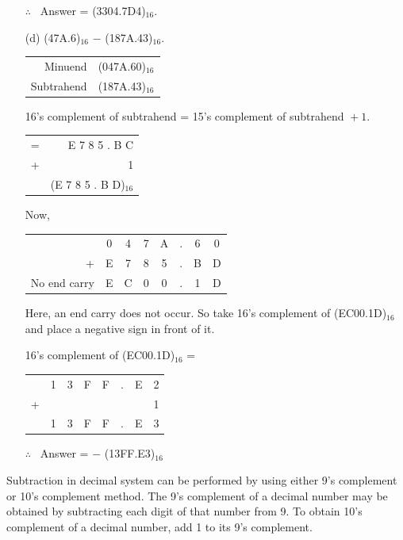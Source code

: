 \begin{solution}
\begin{itemize}
$\therefore$~ Answer = (3304.7D4)$_{16}$.

\item[(d)] (47A.6)$_{16}$ $-$ (187A.43)$_{16}$.
\begin{center}
\begin{tabular}{r@{\;=\;}l}
Minuend & (047A.60)$_{16}$\\
Subtrahend & (187A.43)$_{16}$
\end{tabular}
\end{center}
16's complement of subtrahend = 15's complement of subtrahend ${}+1$.

\smallskip
\begin{tabular}{@{\hspace{2cm}}rr}
= & E 7 8 5 . B C\\
+ & 1\\
\cline{2-2}
 & (E 7 8 5 . B D)$_{16}$
\end{tabular}

Now,
\begin{center}
\tabcolsep=4pt
\begin{tabular}{rccccccc}
 & 0 & 4 & 7 & A & . & 6 & 0\\
+ & E & 7 & 8 & 5 & . & B & D\\
\cline{2-8}
No end carry & E & C & 0 & 0 & . & 1 & D
\end{tabular}
\end{center}
Here, an end carry does not occur. So take 16's complement of (EC00.1D)$_{16}$ and place a negative sign in front of it.

\eject

16's complement of (EC00.1D)$_{16}$ =
\begin{center}
\tabcolsep=3pt
\begin{tabular}{rccccccc}
 & 1 & 3 & F & F & . & E & 2\\
+ & & & & & & & 1\\
\cline{2-8}
 & 1 & 3 & F & F & . & E & 3
\end{tabular}
\end{center}
$\therefore$~ Answer = $-$ (13FF.E3)$_{16}$
\end{itemize}
\end{solution}


Subtraction in decimal system can be performed by using either 9's complement or 10's complement method. The 9's complement of a decimal number may be obtained by subtracting each digit of that number from 9. To obtain 10's complement of a decimal number, add 1 to its 9's complement.

